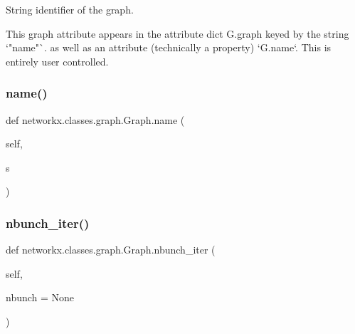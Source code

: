 \begin{DoxyVerb}String identifier of the graph.

This graph attribute appears in the attribute dict G.graph
keyed by the string `"name"`. as well as an attribute (technically
a property) `G.name`. This is entirely user controlled.
\end{DoxyVerb}
 \mbox{\label{classnetworkx_1_1classes_1_1graph_1_1Graph_a11a4ef26bf3776a7d6b90187b5d710ea}} 
\subsubsection{\texorpdfstring{name()}{name()}\hspace{0.1cm}{\footnotesize\ttfamily [2/2]}}
{\footnotesize\ttfamily def networkx.\+classes.\+graph.\+Graph.\+name (\begin{DoxyParamCaption}\item[{}]{self,  }\item[{}]{s }\end{DoxyParamCaption})}

\mbox{\label{classnetworkx_1_1classes_1_1graph_1_1Graph_af3d8e12d43e4ef1973985e4cd45823b3}} 
\subsubsection{\texorpdfstring{nbunch\+\_\+iter()}{nbunch\_iter()}}
{\footnotesize\ttfamily def networkx.\+classes.\+graph.\+Graph.\+nbunch\+\_\+iter (\begin{DoxyParamCaption}\item[{}]{self,  }\item[{}]{nbunch = {\ttfamily None} }\end{DoxyParamCaption})}


